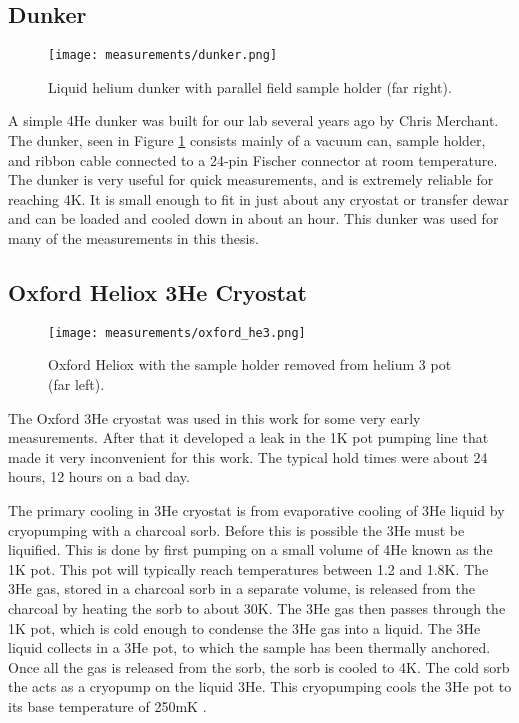 \subsection{Dunker}

\begin{figure}
    \centering
    \texttt{[image: measurements/dunker.png]}
    \caption{Liquid helium dunker with parallel field sample holder (far right).}
    \label{fig:dunker}
\end{figure}

A simple 4He dunker was built for our lab several years ago by Chris Merchant. The dunker, seen in Figure \ref{fig:dunker} consists mainly of a vacuum can, sample holder, and ribbon cable connected to a 24-pin Fischer connector at room temperature. The dunker is very useful for quick measurements, and is extremely reliable for reaching 4K. It is small enough to fit in just about any cryostat or transfer dewar and can be loaded and cooled down in about an hour. This dunker was used for many of the measurements in this thesis.

\subsection{Oxford Heliox 3He Cryostat}

\begin{figure}
    \centering
    \texttt{[image: measurements/oxford\_he3.png]}
    \caption{Oxford Heliox with the sample holder removed from helium 3 pot (far left).}
    \label{fig:heliox}
\end{figure}

The Oxford 3He cryostat was used in this work for some very early measurements. After that it developed a leak in the 1K pot pumping line that made it very inconvenient for this work. The typical hold times were about 24 hours, 12 hours on a bad day.

The primary cooling in 3He cryostat is from evaporative cooling of 3He liquid by cryopumping with a charcoal sorb. Before this is possible the 3He must be liquified. This is done by first pumping on a small volume of 4He known as the 1K pot. This pot will typically reach temperatures between 1.2 and 1.8K. The 3He gas, stored in a charcoal sorb in a separate volume, is released from the charcoal by heating the sorb to about 30K. The 3He gas then passes through the 1K pot, which is cold enough to condense the 3He gas into a liquid. The 3He liquid collects in a 3He pot, to which the sample has been thermally anchored. Once all the gas is released from the sorb, the sorb is cooled to 4K. The cold sorb the acts as a cryopump on the liquid 3He. This cryopumping cools the 3He pot to its base temperature of 250mK \cite{Balshaw2001}.

